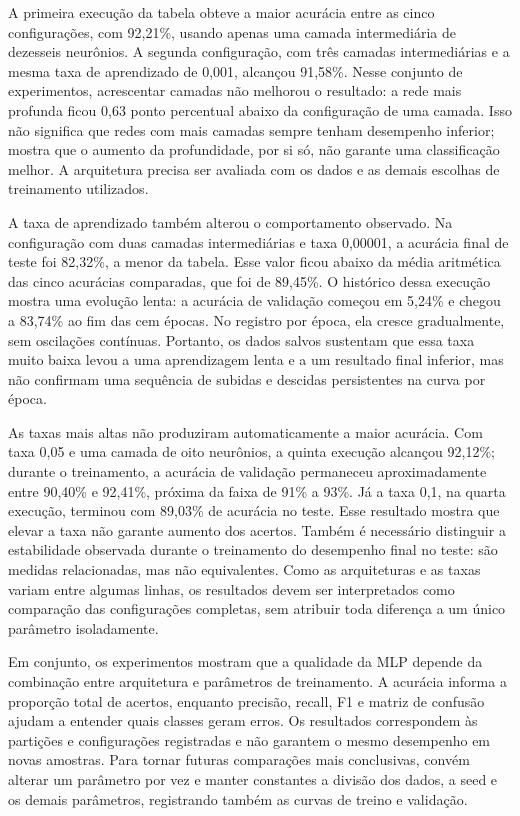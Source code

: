 \documentclass[12pt]{article}
\begin{document}
A primeira execução da tabela obteve a maior acurácia entre as cinco configurações, com 92,21\%, usando apenas uma camada intermediária de dezesseis neurônios. A segunda configuração, com três camadas intermediárias e a mesma taxa de aprendizado de 0,001, alcançou 91,58\%. Nesse conjunto de experimentos, acrescentar camadas não melhorou o resultado: a rede mais profunda ficou 0,63 ponto percentual abaixo da configuração de uma camada. Isso não significa que redes com mais camadas sempre tenham desempenho inferior; mostra que o aumento da profundidade, por si só, não garante uma classificação melhor. A arquitetura precisa ser avaliada com os dados e as demais escolhas de treinamento utilizados.

A taxa de aprendizado também alterou o comportamento observado. Na configuração com duas camadas intermediárias e taxa 0,00001, a acurácia final de teste foi 82,32\%, a menor da tabela. Esse valor ficou abaixo da média aritmética das cinco acurácias comparadas, que foi de 89,45\%. O histórico dessa execução mostra uma evolução lenta: a acurácia de validação começou em 5,24\% e chegou a 83,74\% ao fim das cem épocas. No registro por época, ela cresce gradualmente, sem oscilações contínuas. Portanto, os dados salvos sustentam que essa taxa muito baixa levou a uma aprendizagem lenta e a um resultado final inferior, mas não confirmam uma sequência de subidas e descidas persistentes na curva por época.

As taxas mais altas não produziram automaticamente a maior acurácia. Com taxa 0,05 e uma camada de oito neurônios, a quinta execução alcançou 92,12\%; durante o treinamento, a acurácia de validação permaneceu aproximadamente entre 90,40\% e 92,41\%, próxima da faixa de 91\% a 93\%. Já a taxa 0,1, na quarta execução, terminou com 89,03\% de acurácia no teste. Esse resultado mostra que elevar a taxa não garante aumento dos acertos. Também é necessário distinguir a estabilidade observada durante o treinamento do desempenho final no teste: são medidas relacionadas, mas não equivalentes. Como as arquiteturas e as taxas variam entre algumas linhas, os resultados devem ser interpretados como comparação das configurações completas, sem atribuir toda diferença a um único parâmetro isoladamente.

Em conjunto, os experimentos mostram que a qualidade da MLP depende da combinação entre arquitetura e parâmetros de treinamento. A acurácia informa a proporção total de acertos, enquanto precisão, recall, F1 e matriz de confusão ajudam a entender quais classes geram erros. Os resultados correspondem às partições e configurações registradas e não garantem o mesmo desempenho em novas amostras. Para tornar futuras comparações mais conclusivas, convém alterar um parâmetro por vez e manter constantes a divisão dos dados, a seed e os demais parâmetros, registrando também as curvas de treino e validação.
\end{document}
